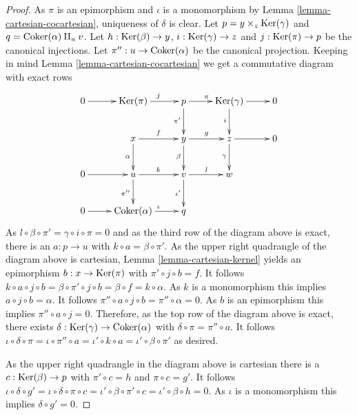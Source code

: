 \begin{proof}
As $\pi$ is an epimorphism and $\iota$ is a
monomorphism by
Lemma \ref{lemma-cartesian-cocartesian},
uniqueness of $\delta$ is clear.
Let $p = y \times_z \mathop{\mathrm{Ker}}(\gamma)$ and $q =
\mathop{\mathrm{Coker}}(\alpha) \amalg_u v$.
Let $h : \mathop{\mathrm{Ker}}(\beta) \to y$, $i :
\mathop{\mathrm{Ker}}(\gamma) \to z$ and
$j : \mathop{\mathrm{Ker}}(\pi) \to p$ be the canonical
injections.
Let $\pi'' : u \to \mathop{\mathrm{Coker}}(\alpha)$ be the
canonical projection.
Keeping in mind Lemma
\ref{lemma-cartesian-cocartesian} we get a
commutative
diagram with exact rows
$$
\xymatrix{
0 \ar[r] &
\Ker(\pi) \ar[r]^j &
p \ar[r]^{\pi} \ar[d]_{\pi'} &
\Ker(\gamma) \ar[d]_i \ar[r] & 0 \\
& x \ar[r]^f \ar[d]_\alpha & y \ar[r]^g
\ar[d]_\beta &
z \ar[d]_\gamma \ar[r] & 0 \\
0 \ar[r] & u \ar[r]^k \ar[d]_{\pi''} &
v \ar[r]^l \ar[d]_{\iota'} & w & \\
0 \ar[r] & \Coker(\alpha) \ar[r]^\iota & q &
&
}
$$
As $l \circ \beta \circ \pi' = \gamma \circ i
\circ \pi = 0$ and as the third
row of the diagram above is exact, there is
an $a : p \to u$
with $k \circ a = \beta \circ \pi'$. As the
upper right quadrangle of the
diagram above is cartesian, Lemma
\ref{lemma-cartesian-kernel} yields an
epimorphism $b : x \to \mathop{\mathrm{Ker}}(\pi)$ with $\pi'
\circ j \circ b = f$.
It follows
$k \circ a \circ j \circ b = \beta \circ \pi'
\circ j \circ b =
\beta \circ f = k \circ \alpha$.
As $k$ is a monomorphism this implies $a
\circ j \circ b = \alpha$. It follows
$\pi'' \circ a \circ j \circ b = \pi'' \circ
\alpha = 0$. As $b$ is an
epimorphism this
implies $\pi'' \circ a \circ j = 0$.
Therefore, as the top row of the diagram
above is exact, there exists
$\delta : \mathop{\mathrm{Ker}}(\gamma) \to \mathop{\mathrm{Coker}}(\alpha)$
with
$\delta \circ \pi = \pi'' \circ a$. It
follows
$\iota \circ \delta \circ \pi = \iota \circ
\pi'' \circ a =
\iota' \circ k \circ a = \iota' \circ \beta
\circ \pi'$
as desired.

\medskip\noindent
As the upper right quadrangle in the diagram
above is cartesian there
is a $c : \mathop{\mathrm{Ker}}(\beta) \to p$ with $\pi' \circ
c = h$ and $\pi \circ c = g'$.
It follows
$\iota \circ \delta \circ g' = \iota \circ
\delta \circ \pi \circ c =
\iota' \circ \beta \circ \pi' \circ c =
\iota' \circ \beta \circ h = 0$.
As $\iota$ is a monomorphism this implies
$\delta \circ g' = 0$.


\end{proof}
